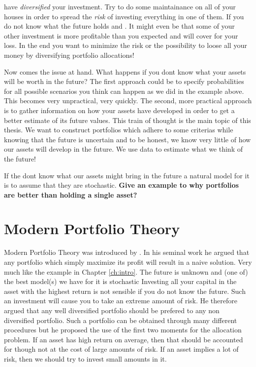 \documentclass[]{book}
\begin{document}
{ have \textit{diversified} your investment.
Try to do some maintainance on all of your houses in order to spread the \textit{risk} of investing everything in one of them. 
If you do not know what the future holds and . It might even be that some of your other investment is more profitable than you expected and will cover for your loss. In the end you want to minimize the risk or the possibility to loose all your money by diversifying portfolio allocations!

Now comes the issue at hand. 
What happens if you dont know what your assets will be worth in the future?
The first approach could be to specify probabilities for all possible scenarios you think can happen as we did in the example above.
This becomes very unpractical, very quickly. 
The second, more practical approach is to gather information on how your assets have developed in order to get a better estimate of its future values.
This train of thought is the main topic of this thesis. 
We want to construct portfolios which adhere to some criterias while knowing that the future is uncertain and to be honest, we know very little of how our assets will develop in the future. We use data to estimate what we think of the future!

If the dont know what our assets might bring in the future a natural model for it is to assume that they are stochastic. \textbf{Give an example to why portfolios are better than holding a single asset?}
}
\chapter{Modern Portfolio Theory}
Modern Portfolio Theory was introduced by \cite{markowitz1959portfolio}. 
In his seminal work he argued that any portfolio which simply maximize its profit will result in a naive solution.
Very much like the example in Chapter \ref{ch:intro}. 
The future is unknown and (one of) the best model(s) we have for it is stochastic
Investing all your capital in the asset with the highest return is not sensible if you do not know the future.
Such an investment will cause you to take an extreme amount of risk. 
He therefore argued that any well diversified portfolio should be prefered to any non diversified portfolio. 
Such a portfolio can be obtained through many different procedures but he proposed the use of the first two moments for the allocation problem.
If an asset has high return on average, then that should be accounted for though not at the cost of large amounts of risk. If an asset implies a lot of risk, then we should try to invest small amounts in it.
\end{document}
